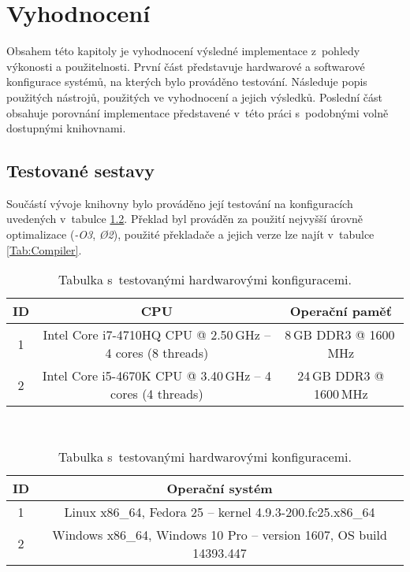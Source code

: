 

\chapter{Vyhodnocení}
\label{Chap:Results}

Obsahem této kapitoly je vyhodnocení výsledné implementace z~pohledy výkonosti a použitelnosti. První část představuje hardwarové a softwarové konfigurace systémů, na kterých bylo prováděno testování. Následuje popis použitých nástrojů, použitých ve vyhodnocení a jejich výsledků. Poslední část obsahuje porovnání implementace představené v~této práci s~podobnými volně dostupnými knihovnami.

\section{Testované sestavy}

Součástí vývoje knihovny bylo prováděno její testování na konfiguracích uvedených v~tabulce \ref{Tab:HW}. Překlad byl prováděn za použití nejvyšší úrovně optimalizace (\emph{-O3}, \emph{\O2}), použité překladače a jejich verze lze najít v~tabulce \ref{Tab:Compiler}. 

\begin{table}[H]
	\begin{center}
		\begin{tabular}{| c | c | c |}
			\hline
			\textbf{ID} & \textbf{CPU} & \textbf{Operační paměť} \\
			\hline
			1 & Intel Core i7-4710HQ CPU @ 2.50\,GHz -- 4 cores (8 threads) & 8\,GB DDR3 @ 1600\,MHz \\
			\hline
			2 & Intel Core i5-4670K CPU @ 3.40\,GHz -- 4 cores (4 threads) & 24\,GB DDR3 @ 1600\,MHz \\
			\hline
		\end{tabular}\\[1em]
		\begin{tabular}{| c | c |}
			\hline
			\textbf{ID} & \textbf{Operační systém} \\
			\hline
			1 & Linux x86\_64, Fedora 25 -- kernel 4.9.3-200.fc25.x86\_64 \\
			\hline
			2 & Windows x86\_64, Windows 10 Pro -- version 1607, OS build 14393.447 \\
			\hline
		\end{tabular}
		\caption{Tabulka s~testovanými hardwarovými konfiguracemi.}
		\label{Tab:HW}
	\end{center}
\end{table}

